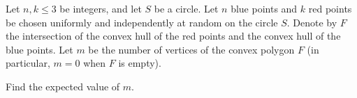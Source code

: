 \documentclass{article}
\begin{document}
\setlength{\parindent}{0pt}
Let $n, k \leq 3$ be integers, and let $S$ be a circle. Let $n$ blue points and $k$ red points be chosen uniformly and independently at random on the circle $S$. Denote by $F$ the intersection of the convex hull of the red points and the convex hull of the blue points. Let $m$ be the number of vertices of the convex polygon $F$ (in particular, $m = 0$ when $F$ is empty).

Find the expected value of $m$.
\end{document}

